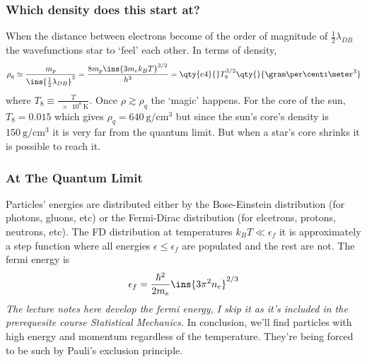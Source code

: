 \subsubsection{Which density does this start at?}
When the distance between electrons become of the order of magnitude of \(\frac{1}{2}\lambda_{DB}\) the wavefunctions star to `feel' each other. In terms of density,
\begin{equation}
    \rho_q \simeq \frac{m_p}{\ins{\frac{1}{2}\lambda_{DB}}^3}=\frac{8m_p\ins{3m_e k_B T}^{3/2}}{h^3} = \qty{e4}{}T_8^{3/2}\qty{}{\gram\per\centi\meter^3}
\end{equation}
where \(T_8 \equiv \frac{T}{\qty{e8}{\kelvin}}\). Once \(\rho \gtrsim \rho_q\) the `magic' happens. For the core of the sun, \(T_8 = 0.015\) which gives \(\rho_q = \qty{640}{\gram\per\centi\meter^3}\) but since the sun's core's density is \(\qty{150}{\gram\per\centi\meter^3}\) it is very far from the quantum limit. But when a star's core shrinks it is possible to reach it.
\subsubsection{At The Quantum Limit}
Particles' energies are distributed either by the Bose-Einstein distribution (for photons, gluons, etc) or the Fermi-Dirac distribution (for elcetrons, protons, neutrons, etc). The FD distribution at temperatures \(k_B T \ll \epsilon_f\) it is approximately a step function where all energies \(\epsilon \leq \epsilon_f\) are populated and the rest are not. The fermi energy is
\begin{equation}
    \epsilon_f = \frac{\hbar^2}{2m_e}\ins{3\pi^2 n_e}^{2/3}
\end{equation}
\emph{The lecture notes here develop the fermi energy, I skip it as it's included in the prerequesite course Statistical Mechanics.} In conclusion, we'll find particles with high energy and momentum regardless of the temperature. They're being forced to be such by Pauli's exclusion principle.
